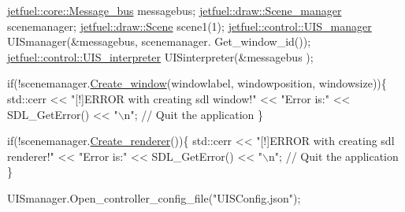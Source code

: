 \begin{DoxyCode}
\hyperlink{classjetfuel_1_1core_1_1Message__bus}{jetfuel::core::Message\_bus} messagebus;
\hyperlink{classjetfuel_1_1draw_1_1Scene__manager}{jetfuel::draw::Scene\_manager} scenemanager;
\hyperlink{classjetfuel_1_1draw_1_1Scene}{jetfuel::draw::Scene} scene1(1);
\hyperlink{classjetfuel_1_1control_1_1UIS__manager}{jetfuel::control::UIS\_manager} UISmanager(&messagebus,
                                      scenemanager.
                                      Get\_window\_id());
\hyperlink{classjetfuel_1_1control_1_1UIS__interpreter}{jetfuel::control::UIS\_interpreter} UISinterpreter(&messagebus
                                                       );

\textcolor{keywordflow}{if}(!scenemanager.\hyperlink{classjetfuel_1_1draw_1_1Scene__manager_a5113e9062c272a22d383ba872417ba31}{Create\_window}(windowlabel,
                               windowposition,
                               windowsize))\{
     std::cerr << \textcolor{stringliteral}{"[!]ERROR with creating sdl window!"}
     << \textcolor{stringliteral}{"Error is:"} << SDL\_GetError() << \textcolor{stringliteral}{"\(\backslash\)n"};
     \textcolor{comment}{// Quit the application}
\}

\textcolor{keywordflow}{if}(!scenemanager.\hyperlink{classjetfuel_1_1draw_1_1Scene__manager_afafecd926ce5e4b2543a6d583a7d24b6}{Create\_renderer}())\{
     std::cerr << \textcolor{stringliteral}{"[!]ERROR with creating sdl renderer!"}
     << \textcolor{stringliteral}{"Error is:"} << SDL\_GetError() << \textcolor{stringliteral}{"\(\backslash\)n"};
     \textcolor{comment}{// Quit the application}
\}

UISmanager.Open\_controller\_config\_file(\textcolor{stringliteral}{"UISConfig.json"});


\end{DoxyCode}
